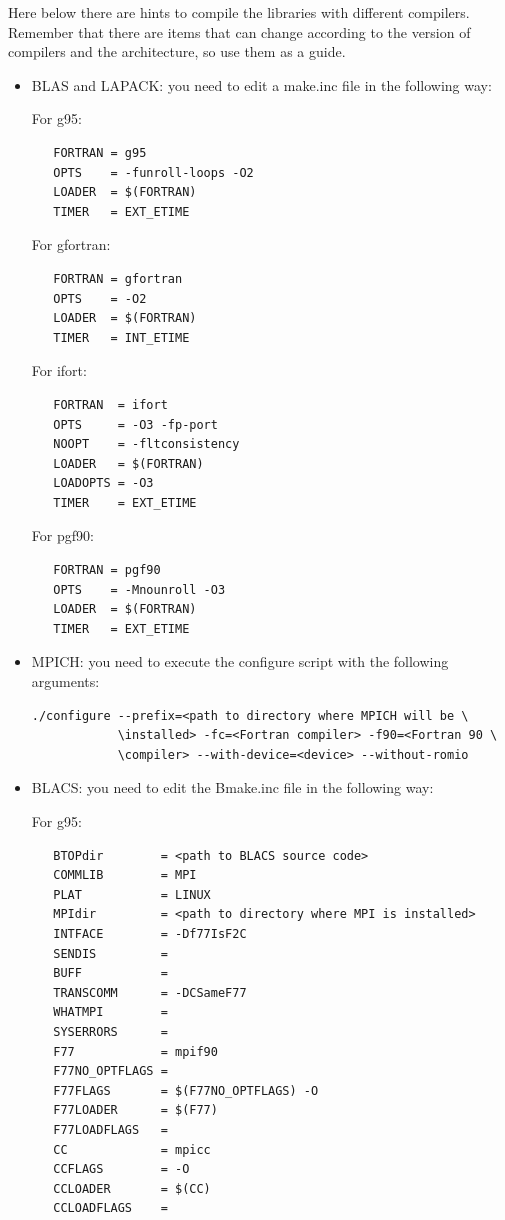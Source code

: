 \documentclass[12pt]{article}
\begin{document}
Here below there are hints to compile the libraries with different compilers. Remember that there are items that can change according to the version of compilers and the architecture, so use them as a guide.
\begin{itemize}
\item BLAS and LAPACK: you need to edit a make.inc file in the following way:

For g95:
\begin{verbatim}
   FORTRAN = g95
   OPTS    = -funroll-loops -O2
   LOADER  = $(FORTRAN)
   TIMER   = EXT_ETIME
\end{verbatim}

For gfortran:
\begin{verbatim}
   FORTRAN = gfortran 
   OPTS    = -O2
   LOADER  = $(FORTRAN)
   TIMER   = INT_ETIME
\end{verbatim}

For ifort:
\begin{verbatim}
   FORTRAN  = ifort
   OPTS     = -O3 -fp-port
   NOOPT    = -fltconsistency
   LOADER   = $(FORTRAN)
   LOADOPTS = -O3
   TIMER    = EXT_ETIME
\end{verbatim}

For pgf90:
\begin{verbatim}
   FORTRAN = pgf90
   OPTS    = -Mnounroll -O3
   LOADER  = $(FORTRAN)
   TIMER   = EXT_ETIME
\end{verbatim}

\item MPICH: you need to execute the configure script with the following arguments:

\begin{verbatim}
./configure --prefix=<path to directory where MPICH will be \ 
            \installed> -fc=<Fortran compiler> -f90=<Fortran 90 \
            \compiler> --with-device=<device> --without-romio
\end{verbatim}

\item BLACS: you need to edit the Bmake.inc file in the following way:

For g95:
\begin{verbatim}
   BTOPdir        = <path to BLACS source code>
   COMMLIB        = MPI
   PLAT           = LINUX
   MPIdir         = <path to directory where MPI is installed>
   INTFACE        = -Df77IsF2C
   SENDIS         =
   BUFF           = 
   TRANSCOMM      = -DCSameF77
   WHATMPI        =
   SYSERRORS      =
   F77            = mpif90
   F77NO_OPTFLAGS = 
   F77FLAGS       = $(F77NO_OPTFLAGS) -O
   F77LOADER      = $(F77)
   F77LOADFLAGS   = 
   CC             = mpicc
   CCFLAGS        = -O
   CCLOADER       = $(CC)
   CCLOADFLAGS    = 
\end{verbatim}


\end{itemize}
\end{document}
